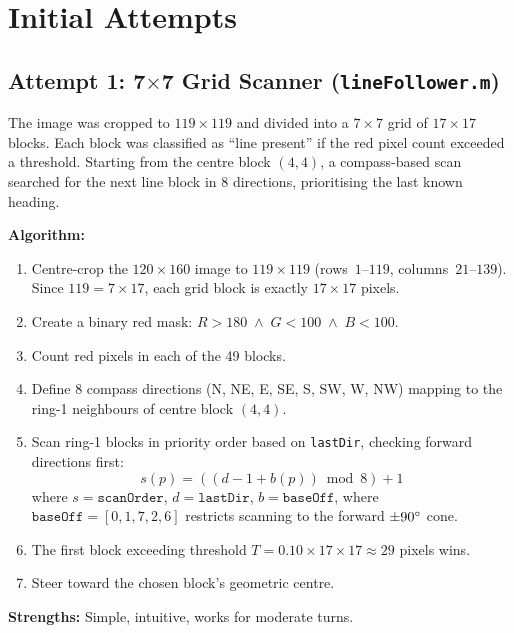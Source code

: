 \documentclass[conference, twocolumn]{IEEEtran}
\begin{document}
\section{Initial Attempts}

\subsection{Attempt 1: 7$\times$7 Grid Scanner (\texttt{lineFollower.m})}

The image was cropped to $119\times119$ and divided into a $7\times7$ grid of $17\times17$ blocks. Each block was classified as ``line present'' if the red pixel count exceeded a threshold. Starting from the centre block $(4,4)$, a compass-based scan searched for the next line block in 8 directions, prioritising the last known heading.

\textbf{Algorithm:}
\begin{enumerate}
    \item Centre-crop the $120\times160$ image to $119\times119$ (rows~$1$--$119$, columns~$21$--$139$). Since $119 = 7 \times 17$, each grid block is exactly $17\times17$ pixels.
    \item Create a binary red mask: $R > 180 \;\wedge\; G < 100 \;\wedge\; B < 100$.
    \item Count red pixels in each of the 49 blocks.
    \item Define 8 compass directions (N, NE, E, SE, S, SW, W, NW) mapping to the ring-1 neighbours of centre block $(4,4)$.
    \item Scan ring-1 blocks in priority order based on \texttt{lastDir}, checking forward directions first:
    \begin{equation}
        s(p) = ((d - 1 + b(p)) \bmod 8) + 1
    \end{equation}
    where $s = \texttt{scanOrder}$, $d = \texttt{lastDir}$, $b = \texttt{baseOff}$,
    where $\texttt{baseOff} = [0, 1, 7, 2, 6]$ restricts scanning to the forward $\pm90\degree$ cone.
    \item The first block exceeding threshold $T = 0.10 \times 17 \times 17 \approx 29$ pixels wins.
    \item Steer toward the chosen block's geometric centre.
\end{enumerate}

\textbf{Strengths:} Simple, intuitive, works for moderate turns.
\end{document}
